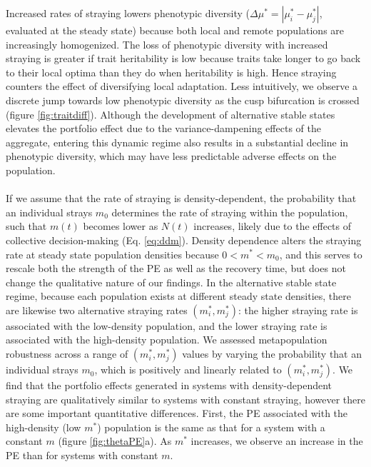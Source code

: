 \documentclass{revtex4}
\begin{document}
Increased rates of straying lowers phenotypic diversity ($\Delta \mu^* = |\mu_i^*-\mu_j^*|$, evaluated at the steady state) because both local and remote populations are increasingly homogenized.
The loss of phenotypic diversity with increased straying is greater if trait heritability is low because traits take longer to go back to their local optima than they do when heritability is high. 
Hence straying counters the effect of diversifying local adaptation. 
Less intuitively, we observe a discrete jump towards low phenotypic diversity as the cusp bifurcation is crossed (figure \ref{fig:traitdiff}).
Although the development of alternative stable states elevates the portfolio effect due to the variance-dampening effects of the aggregate, entering this dynamic regime also results in a substantial decline in phenotypic diversity, which may have less predictable adverse effects on the population.\\


 \\
If we assume that the rate of straying is density-dependent, the probability that an individual strays $m_0$ determines the rate of straying within the population, such that $m(t)$ becomes lower as $N(t)$ increases, likely due to the effects of collective decision-making \citep{Berdahl:2016dx} (Eq. \ref{eq:ddm}).
Density dependence alters the straying rate at steady state population densities because $0 < m^* < m_0$, and this serves to rescale both the strength of the PE as well as the recovery time, but does not change the qualitative nature of our findings.
In the alternative stable state regime, because each population exists at different steady state densities, there are likewise two alternative straying rates $(m_i^*,m_j^*)$: the higher straying rate is associated with the low-density population, and the lower straying rate is associated with the high-density population.
We assessed metapopulation robustness across a range of $(m_i^*,m_j^*)$ values by varying the probability that an individual strays $m_0$, which is positively and linearly related to $(m_i^*,m_j^*)$.
We find that the portfolio effects generated in systems with density-dependent straying are qualitatively similar to systems with constant straying, however there are some important quantitative differences.
First, the PE associated with the high-density (low $m^*$) population is the same as that for a system with a constant $m$ (figure \ref{fig:thetaPE}a).
As $m^*$ increases, we observe an increase in the PE than for systems with constant $m$.
\end{document}
